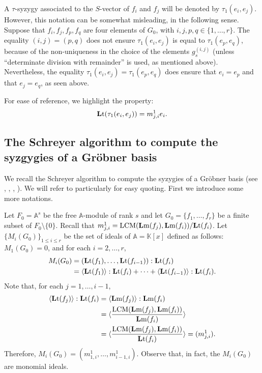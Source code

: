 \documentclass[ALCO]{cedram}
\newcommand{\mbk}{\mbox{$\mathbb{K}$}}
\newcommand{\mba}{\mbox{$\mathbb{A}$}}
\newcommand{\lm}{\mbox{${\bf L}{\rm m}$}}
\newcommand{\lt}{\mbox{${\bf L}{\rm t}$}}
\newcommand{\Lcm}{\mbox{${\rm LCM}$}}
\begin{document}
\begin{discussion}
A $\tau$-syzygy associated to the $S$-vector of $f_i$ and $f_j$ will
be denoted by $\tau_1(e_i,e_j)$. However, this notation can be
somewhat misleading, in the following sense. Suppose that
$f_{i},f_{j},f_{p},f_{q}$ are four elements of $G_0$, with
$i,j,p,q\in\{1,\ldots ,r\}$. The equality $(i,j)=(p,q)$ does not
ensure $\tau_1(e_i,e_j)$ is equal to $\tau_1(e_p,e_q)$, because of the
non-uniqueness in the choice of the elements $g_s^{(i,j)}$ (unless
``determinate division with remainder'' is used, as mentioned
above). Nevertheless, the equality $\tau_1(e_i,e_j)=\tau_1(e_p,e_q)$
does ensure that $e_i=e_p$ and that $e_j=e_q$, as seen above.

For ease of reference, we highlight the property:
\begin{eqnarray}\label{inducedlm}
\lt(\tau_1(e_i,e_j))=m^1_{j,i}e_i.
\end{eqnarray}
\end{discussion}

\subsection{The Schreyer algorithm to compute
the syzgygies of a Gr\"obner basis}\label{schreyer-alg}

 We recall the Schreyer algorithm to compute the syzygies of
a Gr\"obner basis (see \cite[Theorem~3.2 and Proposition~3.5]{emss},
\cite[Corollary~2.3.19]{ds}, \cite[Corollary~1.11]{bs},
\cite[Theorem~15.10, Corollary~15.11]{eisenbud}).  We will refer to
\cite{emss} particularly for easy quoting. First we introduce some more
notations.

\begin{notation}\label{module-quotients}
Let $F_0=\mba^s$ be the free $\mba$-module of rank $s$ and let
$G_0=\{f_1,\ldots ,f_r\}$ be a finite subset of
$F_0\setminus\{0\}$. Recall that
$m^1_{j,i}=\Lcm(\lm(f_j),\lm(f_i))/\lt(f_i)$.  Let
$\{M_i(G_0)\}_{1\leq i\leq r}$ be the set of ideals of $\mba=\mbk[x]$
defined as follows: $M_1(G_0)=0$, and for each $i=2,\ldots,r$,
\begin{align*}
M_i(G_0)&=(\lt(f_1),\ldots,\lt(f_{i-1})):\lt(f_i)\\
&=  \langle\lt(f_1)\rangle:\lt(f_i)+\cdots+\langle\lt(f_{i-1})\rangle:\lt(f_i).
\end{align*}
Note that, for each $j=1,\ldots, i-1$,
\begin{align*}
\langle \lt(f_j)\rangle: \lt(f_i)&=\langle
  \lm(f_j)\rangle:\lm(f_i)\\
&=\langle  \frac{\Lcm(\lm(f_j),\lm(f_i))}{\lm(f_i)}\rangle\\
&= \langle \frac{\Lcm(\lm(f_j),\lm(f_i))}{\lt(f_i)}\rangle=(m^1_{j,i}).
\end{align*}
Therefore, $M_i(G_0)=(m^1_{1,i},\ldots , m^1_{i-1,i})$. Observe that,
in fact, the $M_i(G_0)$ are monomial ideals.
\end{notation}
\end{document}
